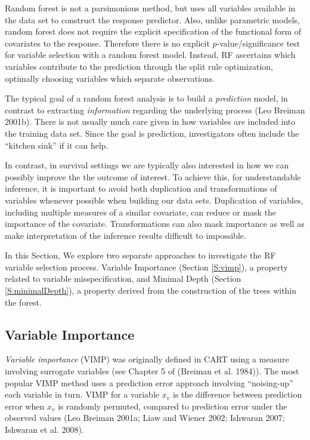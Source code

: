 \documentclass[article, nojss]{jss}
\begin{document}
Random forest is not a parsimonious method, but uses all variables
available in the data set to construct the response predictor. Also,
unlike parametric models, random forest does not require the explicit
specification of the functional form of covariates to the response.
Therefore there is no explicit \(p\)-value/significance test for
variable selection with a random forest model. Instead, RF ascertains
which variables contribute to the prediction through the split rule
optimization, optimally choosing variables which separate observations.

The typical goal of a random forest analysis is to build a
\emph{prediction} model, in contrast to extracting \emph{information}
regarding the underlying process (Leo Breiman 2001b). There is not
usually much care given in how variables are included into the training
data set. Since the goal is prediction, investigators often include the
``kitchen sink'' if it can help.

In contrast, in survival settings we are typically also interested in
how we can possibly improve the the outcome of interest. To achieve
this, for understandable inference, it is important to avoid both
duplication and transformations of variables whenever possible when
building our data sets. Duplication of variables, including multiple
measures of a similar covariate, can reduce or mask the importance of
the covariate. Transformations can also mask importance as well as make
interpretation of the inference results difficult to impossible.

In this Section, We explore two separate approaches to investigate the
RF variable selection process. Variable Importance (Section
\ref{S:vimp}), a property related to variable misspecification, and
Minimal Depth (Section \ref{S:minimalDepth}), a property derived from
the construction of the trees within the forest.

\subsection{Variable Importance}\label{variable-importance}

\emph{Variable importance} (VIMP) was originally defined in CART using a
measure involving surrogate variables (see Chapter 5 of (Breiman et al.
1984)). The most popular VIMP method uses a prediction error approach
involving ``noising-up'' each variable in turn. VIMP for a variable
\(x_v\) is the difference between prediction error when \(x_v\) is
randomly permuted, compared to prediction error under the observed
values (Leo Breiman 2001a; Liaw and Wiener 2002; Ishwaran 2007; Ishwaran
et al. 2008).
\end{document}
